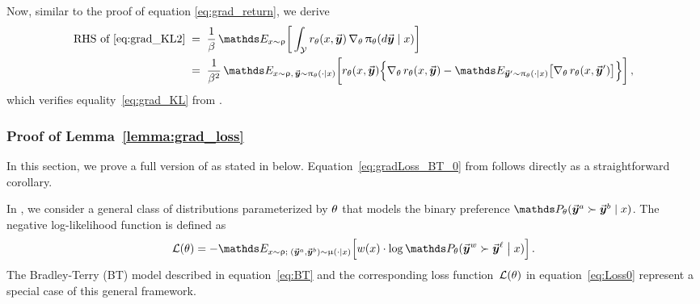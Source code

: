 		Now, similar to the proof of equation \eqref{eq:grad_return}, we derive
		\begin{align*}
			\mbox{RHS of \eqref{eq:grad_KL2}}
			& \; = \; \frac{1}{\parabeta} \, \Exp_{\prompt \sim \promptdistr} \bigg[ \int_{\ResponseSp} \rewardtheta(\prompt, \response) \, \gradtheta \policytheta(\diff \response \mid \prompt) \bigg]  \\
			& \; = \; \frac{1}{\parabeta^2} \,\Exp_{\prompt \sim \promptdistr, \, \response \sim \policytheta(\cdot \mid \prompt)} \bigg[ \rewardtheta(\prompt, \response) 
			\Big\{ \gradtheta \rewardtheta(\prompt, \response) - \Exp_{\responsenew \sim \policytheta(\cdot \mid \prompt)}\big[ \gradtheta \rewardtheta(\prompt, \responsenew) \big] \Big\} \bigg] \, ,
		\end{align*}
		which verifies equality~\eqref{eq:grad_KL} from .
		

		
		
		
		



	\subsubsection{Proof of Lemma~\ref{lemma:grad_loss} \yaqidone}
	\label{sec:proof:lemma:grad_loss}
	
	In this section, we prove a full version of  as stated in  below. Equation~\eqref{eq:gradLoss_BT_0} from  follows directly as a straightforward corollary.
	
	In , we consider a general class of distributions parameterized by $\theta$ that models the binary preference \mbox{$\Probtheta(\responseone \succ \responsetwo \mid \prompt)$}. The negative log-likelihood function is defined as
	\begin{align*}
		\Loss(\theta) = - \Exp_{\prompt \sim \promptdistr; \; (\responseone, \responsetwo) \sim \responsedistr(\cdot \mid \prompt)} \Big[ \weight(\prompt) \cdot \log \Probtheta( \responsewin \succ \responselose \bigm| \prompt) \Big] \, .
	\end{align*}
	The Bradley-Terry (BT) model described in equation~\eqref{eq:BT} and the corresponding loss function~$\mathcal{L}(\theta)$ in equation~\eqref{eq:Loss0} represent a special case of this general framework.
	
